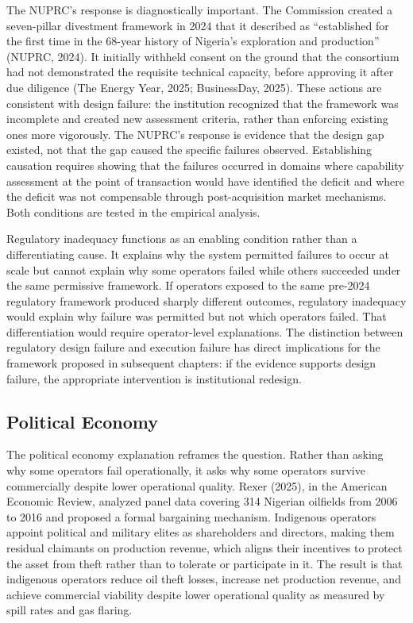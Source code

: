 \documentclass[twoside,fontset=lmodern]{mitthesis}
\begin{document}
The NUPRC's response is diagnostically important. The Commission created
a seven-pillar divestment framework in 2024 that it described as
``established for the first time in the 68-year history of Nigeria's
exploration and production'' (NUPRC, 2024). It initially withheld
consent on the ground that the consortium had not demonstrated the
requisite technical capacity, before approving it after due diligence
(The Energy Year, 2025; BusinessDay, 2025). These actions are consistent
with design failure: the institution recognized that the framework was
incomplete and created new assessment criteria, rather than enforcing
existing ones more vigorously. The NUPRC's response is evidence that the
design gap existed, not that the gap caused the specific failures
observed. Establishing causation requires showing that the failures
occurred in domains where capability assessment at the point of
transaction would have identified the deficit and where the deficit was
not compensable through post-acquisition market mechanisms. Both
conditions are tested in the empirical analysis.

Regulatory inadequacy functions as an enabling condition rather than a
differentiating cause. It explains why the system permitted failures to
occur at scale but cannot explain why some operators failed while others
succeeded under the same permissive framework. If operators exposed to
the same pre-2024 regulatory framework produced sharply different
outcomes, regulatory inadequacy would explain why failure was permitted
but not which operators failed. That differentiation would require
operator-level explanations. The distinction between regulatory design
failure and execution failure has direct implications for the framework
proposed in subsequent chapters: if the evidence supports design
failure, the appropriate intervention is institutional redesign.

\hypertarget{political-economy}{%
\subsection{Political Economy}\label{political-economy}}

The political economy explanation reframes the question. Rather than
asking why some operators fail operationally, it asks why some operators
survive commercially despite lower operational quality. Rexer (2025), in
the American Economic Review, analyzed panel data covering 314 Nigerian
oilfields from 2006 to 2016 and proposed a formal bargaining mechanism.
Indigenous operators appoint political and military elites as
shareholders and directors, making them residual claimants on production
revenue, which aligns their incentives to protect the asset from theft
rather than to tolerate or participate in it. The result is that
indigenous operators reduce oil theft losses, increase net production
revenue, and achieve commercial viability despite lower operational
quality as measured by spill rates and gas flaring.
\end{document}
